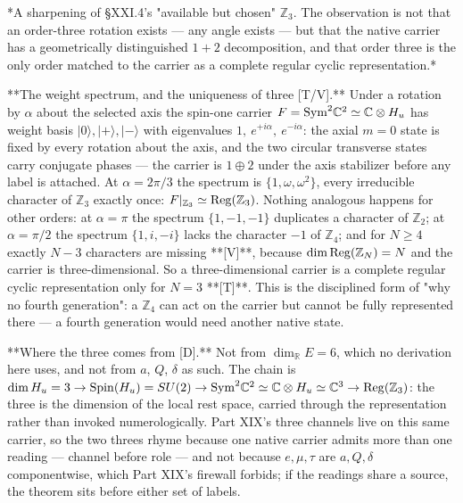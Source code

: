 *A sharpening of §XXI.4's "available but chosen" $\mathbb Z_3$. The observation is not that an order-three rotation exists — any angle exists — but that the native carrier has a geometrically distinguished $1+2$ decomposition, and that order three is the only order matched to the carrier as a complete regular cyclic representation.*

**The weight spectrum, and the uniqueness of three [T/V].** Under a rotation by $\alpha$ about the selected axis the spin-one carrier $F = {\rm Sym}^2\mathbb C^2\simeq\mathbb C\otimes H_u$ has weight basis $|0\rangle,|+\rangle,|-\rangle$ with eigenvalues $1,\ e^{+i\alpha},\ e^{-i\alpha}$: the axial $m = 0$ state is fixed by every rotation about the axis, and the two circular transverse states carry conjugate phases — the carrier is $1\oplus2$ under the axis stabilizer before any label is attached. At $\alpha = 2\pi/3$ the spectrum is $\{1,\omega,\omega^2\}$, every irreducible character of $\mathbb Z_3$ exactly once: $F|_{\mathbb Z_3}\simeq{\rm Reg}(\mathbb Z_3)$. Nothing analogous happens for other orders: at $\alpha = \pi$ the spectrum $\{1,-1,-1\}$ duplicates a character of $\mathbb Z_2$; at $\alpha = \pi/2$ the spectrum $\{1,i,-i\}$ lacks the character $-1$ of $\mathbb Z_4$; and for $N\geq4$ exactly $N-3$ characters are missing **[V]**, because $\dim{\rm Reg}(\mathbb Z_N) = N$ and the carrier is three-dimensional. So a three-dimensional carrier is a complete regular cyclic representation only for $N = 3$ **[T]**. This is the disciplined form of "why no fourth generation": a $\mathbb Z_4$ can act on the carrier but cannot be fully represented there — a fourth generation would need another native state.

**Where the three comes from [D].** Not from $\dim_{\mathbb R}E = 6$, which no derivation here uses, and not from $a$, $Q$, $\delta$ as such. The chain is $\dim H_u = 3\to{\rm Spin}(H_u) = SU(2)\to{\rm Sym}^2\mathbb C^2\simeq\mathbb C\otimes H_u\simeq\mathbb C^3\to{\rm Reg}(\mathbb Z_3)$: the three is the dimension of the local rest space, carried through the representation rather than invoked numerologically. Part XIX's three channels live on this same carrier, so the two threes rhyme because one native carrier admits more than one reading — channel before role — and not because $e,\mu,\tau$ are $a,Q,\delta$ componentwise, which Part XIX's firewall forbids; if the readings share a source, the theorem sits before either set of labels.

